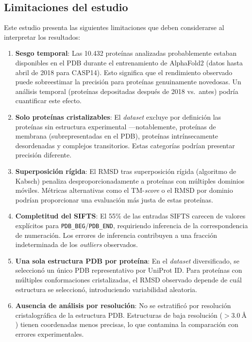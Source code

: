 \subsection{Limitaciones del estudio}
\label{subsec:limitaciones}

Este estudio presenta las siguientes limitaciones que deben considerarse al interpretar
los resultados:

\begin{enumerate}
    \item \textbf{Sesgo temporal}: Las 10.432 prote\'inas analizadas probablemente
    estaban disponibles en el PDB durante el entrenamiento de AlphaFold2 (datos hasta
    abril de 2018 para CASP14). Esto significa que el rendimiento observado puede
    sobreestimar la precisi\'on para prote\'inas genuinamente novedosas. Un an\'alisis
    temporal (prote\'inas depositadas despu\'es de 2018 vs.\ antes) podr\'ia cuantificar
    este efecto.

    \item \textbf{Solo prote\'inas cristalizables}: El \textit{dataset} excluye por definici\'on
    las prote\'inas sin estructura experimental ---notablemente, prote\'inas de membrana
    (subrepresentadas en el PDB), prote\'inas intr\'insecamente desordenadas y
    complejos transitorios. Estas categor\'ias podr\'ian presentar precisi\'on diferente.

    \item \textbf{Superposici\'on r\'igida}: El RMSD tras superposici\'on r\'igida
    (algoritmo de Kabsch) penaliza desproporcionadamente a prote\'inas con m\'ultiples
    dominios m\'oviles. M\'etricas alternativas como el TM-\textit{score} o el RMSD por dominio
    podr\'ian proporcionar una evaluaci\'on m\'as justa de estas prote\'inas.

    \item \textbf{Completitud del SIFTS}: El 55\% de las entradas SIFTS carecen de
    valores expl\'icitos para \texttt{PDB\_BEG}/\texttt{PDB\_END}, requiriendo
    inferencia de la correspondencia de numeraci\'on. Los errores de inferencia
    contribuyen a una fracci\'on indeterminada de los \textit{outliers} observados.

    \item \textbf{Una sola estructura PDB por prote\'ina}: En el \textit{dataset} diversificado,
    se seleccion\'o un \'unico PDB representativo por UniProt ID. Para prote\'inas con
    m\'ultiples conformaciones cristalizadas, el RMSD observado depende de cu\'al
    estructura se seleccion\'o, introduciendo variabilidad aleatoria.

    \item \textbf{Ausencia de an\'alisis por resoluci\'on}: No se estratific\'o por
    resoluci\'on cristalográfica de la estructura PDB. Estructuras de baja resoluci\'on
    ($> \SI{3,0}{\angstrom}$) tienen coordenadas menos precisas, lo que contamina la
    comparaci\'on con errores experimentales.
\end{enumerate}
